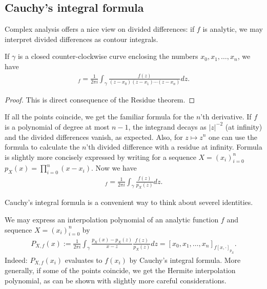 \subsection{Cauchy's integral formula}

Complex analysis offers a nice view on divided differences: if $f$ is analytic, we may interpret divided differences as contour integrals.

\begin{lem}\label{div_cauchy}
If $\gamma$ is a closed counter-clockwise curve enclosing the numbers $x_{0}, x_{1}, \ldots, x_{n}$, we have
\begin{align*}
	[x_{0}, x_{1}, \ldots, x_{n}]_{f} = \frac{1}{2 \pi i} \int_{\gamma} \frac{f(z)}{(z - x_{0})(z - x_{1}) \cdots (z - x_{n})} dz.
\end{align*}
\end{lem}
\begin{proof}
This is direct consequence of the Residue theorem.
\end{proof}

If all the points coincide, we get the familiar formula for the $n$'th derivative. If $f$ is a polynomial of degree at most $n - 1$, the integrand decays as $|z|^{-2}$ (at infinity) and the divided differences vanish, as expected. Also, for $z \mapsto z^{n}$ one can use the formula to calculate the $n$'th divided difference with a residue at infinity. Formula is slightly more concisely expressed by writing for a sequence $X = (x_{i})_{i = 0}^{n}$ $p_{X}(x) = \prod_{i = 0}^{n} (x - x_{i})$. Now we have
\begin{align*}
	[x_{0}, x_{1}, \ldots, x_{n}]_{f} = \frac{1}{2 \pi i} \int_{\gamma} \frac{f(z)}{p_{X}(z)} dz.
\end{align*}

Cauchy's integral formula is a convenient way to think about severel identities.

\begin{esim}
We may express an interpolation polynomial of an analytic function $f$ and sequence $X = (x_{i})_{i = 0}^{n}$ by
\begin{align*}
	P_{X, f}(x) := \frac{1}{2 \pi i} \int_{\gamma} \frac{p_{X}(x) - p_{X}(z)}{x - z}\frac{f(z)}{p_{X}(z)} dz = [x_{0}, x_{1}, \ldots, x_{n}]_{f [x, \cdot]_{p_{X}}}.
\end{align*}
Indeed: $P_{X, f}(x_{i})$ evaluates to $f(x_{i})$ by Cauchy's integral formula. More generally, if some of the points coincide, we get the Hermite interpolation polynomial, as can be shown with slightly more careful considerations.
\end{esim}

